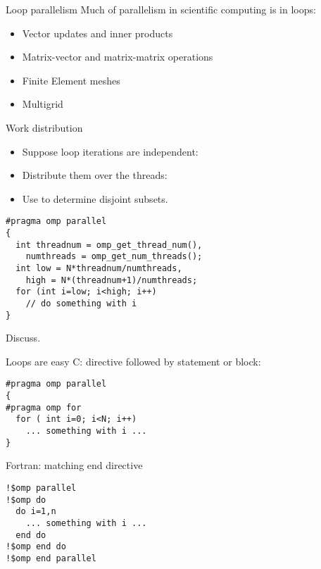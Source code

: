 
\begin{numberedframe}{Loop parallelism}
  Much of parallelism in scientific computing is in loops:
  \begin{itemize}
  \item Vector updates and inner products
  \item Matrix-vector and matrix-matrix operations
  \item Finite Element meshes
  \item Multigrid
  \end{itemize}
\end{numberedframe}

\begin{numberedframe}{Work distribution}
  \begin{itemize}
  \item Suppose loop iterations are independent:
  \item Distribute them over the threads:
  \item Use  to determine disjoint subsets.
  \end{itemize}
\begin{lstlisting}
#pragma omp parallel
{
  int threadnum = omp_get_thread_num(),
    numthreads = omp_get_num_threads();
  int low = N*threadnum/numthreads,
    high = N*(threadnum+1)/numthreads;
  for (int i=low; i<high; i++)
    // do something with i
}
\end{lstlisting}
Discuss.
\end{numberedframe}

\begin{numberedframe}{Loops are easy}
C: directive followed by statement or block:
\begin{lstlisting}
#pragma omp parallel
{
#pragma omp for
  for ( int i=0; i<N; i++)
    ... something with i ...
}
\end{lstlisting}
Fortran: matching end directive
\begin{lstlisting}
!$omp parallel
!$omp do
  do i=1,n
    ... something with i ...
  end do
!$omp end do
!$omp end parallel
\end{lstlisting}
\end{numberedframe}

